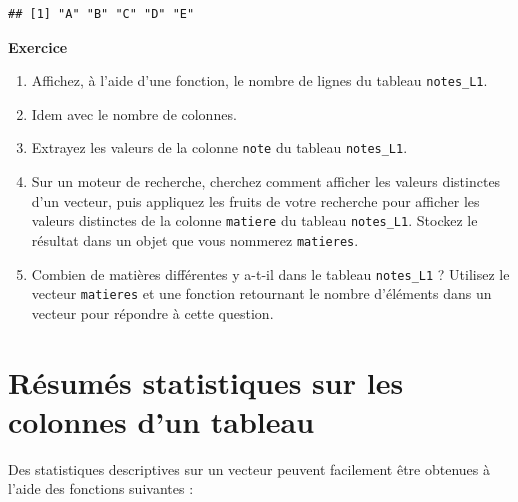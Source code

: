 \documentclass[
  11pt,
]{book}
\newcommand{\VERB}{\Verb[commandchars=\\\{\}]}
\newcommand{\FunctionTok}[1]{\textcolor[rgb]{0.13,0.29,0.53}{\textbf{#1}}}
\newcommand{\NormalTok}[1]{#1}
\providecommand{\tightlist}{%
  \setlength{\itemsep}{0pt}\setlength{\parskip}{0pt}}
\numberwithin{equation}{section}
\numberwithin{countremarque}{section}
\newenvironment{greenbox}{
  \begin{tcolorbox}[breakable, colback=vert,coltext=black,
                  colframe=grisfonce]}
 {\end{tcolorbox}}
\begin{document}
\begin{lstlisting}
## [1] "A" "B" "C" "D" "E"
\end{lstlisting}

\begin{greenbox}

\textbf{Exercice}

\begin{enumerate}
\def\labelenumi{\arabic{enumi}.}
\tightlist
\item
  Affichez, à l'aide d'une fonction, le nombre de lignes du tableau \texttt{notes\_L1}.
\item
  Idem avec le nombre de colonnes.
\item
  Extrayez les valeurs de la colonne \texttt{note} du tableau \texttt{notes\_L1}.
\item
  Sur un moteur de recherche, cherchez comment afficher les valeurs distinctes d'un vecteur, puis appliquez les fruits de votre recherche pour afficher les valeurs distinctes de la colonne \texttt{matiere} du tableau \texttt{notes\_L1}. Stockez le résultat dans un objet que vous nommerez \texttt{matieres}.
\item
  Combien de matières différentes y a-t-il dans le tableau \texttt{notes\_L1} ? Utilisez le vecteur \texttt{matieres} et une fonction retournant le nombre d'éléments dans un vecteur pour répondre à cette question.
\end{enumerate}

\end{greenbox}

\hypertarget{ruxe9sumuxe9s-statistiques-sur-les-colonnes-dun-tableau}{%
\section{Résumés statistiques sur les colonnes d'un tableau}\label{ruxe9sumuxe9s-statistiques-sur-les-colonnes-dun-tableau}}

Des statistiques descriptives sur un vecteur peuvent facilement être obtenues à l'aide des fonctions suivantes :

\end{document}
